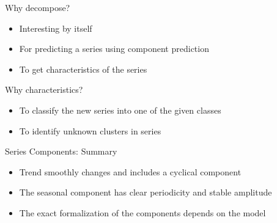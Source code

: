 \begin{frame}{Why decompose?}
	
	\begin{itemize}[<+->]
		\item Interesting \alert{by itself}
		\item For \alert{predicting} a series using component prediction
		\item To get \alert{characteristics of the series}
	\end{itemize}
	
	\pause
	Why characteristics?
	
	\begin{itemize}[<+->]
		\item To classify the new series into one of the given classes
		\item To identify unknown clusters in series
	\end{itemize}
	
\end{frame}


\begin{frame}{Series Components: Summary}
	\begin{itemize}[<+->]
		\item Trend \alert{smoothly changes} and includes a cyclical component
		\item The seasonal component has \alert{clear periodicity} and \alert{stable amplitude}
		\item The exact formalization of the components \alert{depends on the model}
	\end{itemize}
	
\end{frame}